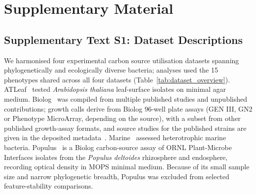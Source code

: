 
\section*{Supplementary Material}

  \renewcommand{\thefigure}{S\arabic{figure}}
  \setcounter{figure}{0}

  \renewcommand{\thetable}{S\arabic{table}}
  \setcounter{table}{0}


\subsection*{Supplementary Text S1: Dataset Descriptions}

We harmonised four experimental carbon source utilisation datasets spanning phylogenetically and ecologically diverse bacteria; analyses used the 15 phenotypes shared across all four datasets (Table~\ref{tab:dataset_overview}).
ATLeaf~\cite{Schafer2023-nk} tested \textit{Arabidopsis thaliana} leaf-surface isolates on minimal agar medium.
Biolog~\cite{BiologDatasetCitation} was compiled from multiple published studies and unpublished contributions; growth calls derive from Biolog 96-well plate assays (GEN III, GN2 or Phenotype MicroArray, depending on the source), with a subset from other published growth-assay formats, and source studies for the published strains are given in the deposited metadata~\cite{ZenodoDeposit}.
Marine~\cite{Gralka2023-ft} assessed heterotrophic marine bacteria.
Populus~\cite{PopulusDatasetCitation} is a Biolog carbon-source assay of ORNL Plant-Microbe Interfaces isolates from the \textit{Populus deltoides} rhizosphere and endosphere, recording optical density in MOPS minimal medium.
Because of its small sample size and narrow phylogenetic breadth, Populus was excluded from selected feature-stability comparisons.

